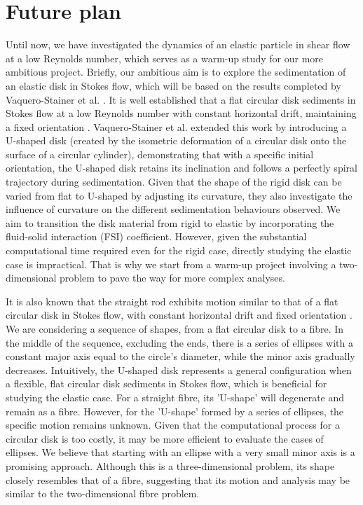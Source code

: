 \documentclass[12pt,MSc,twoside]{muthesis_2020}
\begin{document}
\chapter{Future plan}
Until now, we have investigated the dynamics of an elastic particle in shear flow at a low Reynolds number, which serves as a warm-up study for our more ambitious project. Briefly, our ambitious aim is to explore the sedimentation of an elastic disk in Stokes flow, which will be based on the results completed by Vaquero-Stainer et al. \cite{vaquero2024u}. It is well established that a flat circular disk sediments in Stokes flow at a low Reynolds number with constant horizontal drift, maintaining a fixed orientation \cite{brenner1963stokes}. Vaquero-Stainer et al. extended this work by introducing a U-shaped disk (created by the isometric deformation of a circular disk onto the surface of a circular cylinder), demonstrating that with a specific initial orientation, the U-shaped disk retains its inclination and follows a perfectly spiral trajectory during sedimentation. Given that the shape of the rigid disk can be varied from flat to U-shaped by adjusting its curvature, they also investigate the influence of curvature on the different sedimentation behaviours observed. We aim to transition the disk material from rigid to elastic by incorporating the fluid-solid interaction (FSI) coefficient. However, given the substantial computational time required even for the rigid case, directly studying the elastic case is impractical. That is why we start from a warm-up project involving a two-dimensional problem to pave the way for more complex analyses.

It is also known that the straight rod exhibits motion similar to that of a flat circular disk in Stokes flow, with constant horizontal drift and fixed orientation \cite{brenner1963stokes}. We are considering a sequence of shapes, from a flat circular disk to a fibre. In the middle of the sequence, excluding the ends, there is a series of ellipses with a constant major axis equal to the circle's diameter, while the minor axis gradually decreases. Intuitively, the U-shaped disk represents a general configuration when a flexible, flat circular disk sediments in Stokes flow, which is beneficial for studying the elastic case. For a straight fibre, its 'U-shape' will degenerate and remain as a fibre. However, for the 'U-shape' formed by a series of ellipses, the specific motion remains unknown. Given that the computational process for a circular disk is too costly, it may be more efficient to evaluate the cases of ellipses. We believe that starting with an ellipse with a very small minor axis is a promising approach. Although this is a three-dimensional problem, its shape closely resembles that of a fibre, suggesting that its motion and analysis may be similar to the two-dimensional fibre problem.
\end{document}

